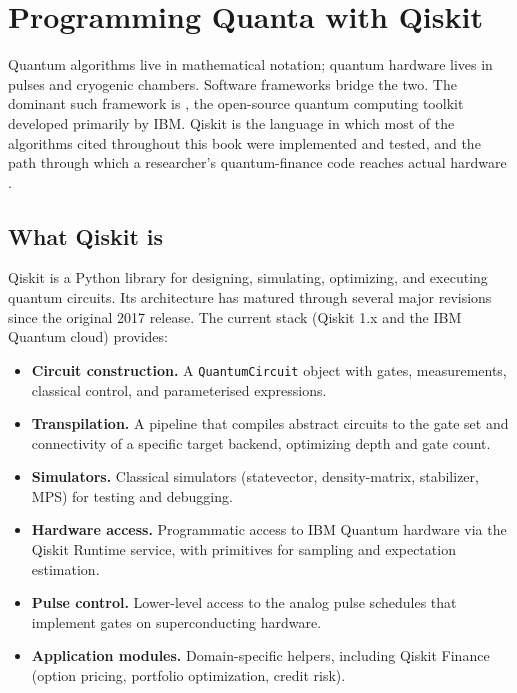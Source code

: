 \chapter{Programming Quanta with Qiskit}


Quantum algorithms live in mathematical notation; quantum hardware lives in pulses and cryogenic chambers. Software frameworks bridge the two. The dominant such framework is , the open-source quantum computing toolkit developed primarily by IBM. Qiskit is the language in which most of the algorithms cited throughout this book were implemented and tested, and the path through which a researcher's quantum-finance code reaches actual hardware \citep{pathak_evolution_2025}.

\section{What Qiskit is}

Qiskit is a Python library for designing, simulating, optimizing, and executing quantum circuits. Its architecture has matured through several major revisions since the original 2017 release. The current stack (Qiskit 1.x and the IBM Quantum cloud) provides:

\begin{itemize}
  \item \textbf{Circuit construction.} A \texttt{QuantumCircuit} object with gates, measurements, classical control, and parameterised expressions.
  \item \textbf{Transpilation.} A pipeline that compiles abstract circuits to the gate set and connectivity of a specific target backend, optimizing depth and gate count.
  \item \textbf{Simulators.} Classical simulators (statevector, density-matrix, stabilizer, MPS) for testing and debugging.
  \item \textbf{Hardware access.} Programmatic access to IBM Quantum hardware via the Qiskit Runtime service, with primitives for sampling and expectation estimation.
  \item \textbf{Pulse control.} Lower-level access to the analog pulse schedules that implement gates on superconducting hardware.
  \item \textbf{Application modules.} Domain-specific helpers, including Qiskit Finance (option pricing, portfolio optimization, credit risk).
\end{itemize}

